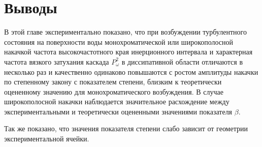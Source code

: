 \section{Выводы} %


В этой главе экспериментально показано, что при возбуждении турбулентного состояния на поверхности воды монохроматической или широкополосной накачкой частота высокочастотного края инерционного интервала и характерная частота вязкого затухания каскада $P^2_\omega$ в диссипативной области отличаются в несколько раз и качественно одинаково повышаются с ростом амплитуды накачки по степенному закону с показателем степени, близким к теоретически оцененному значению для монохроматического возбуждения. В случае широкополосной накачки наблюдается значительное расхождение между экспериментальными и теоретически оцененными значениями показателя $\beta$.

Так же показано, что значения показателя степени слабо зависит от геометрии экспериментальной ячейки.


